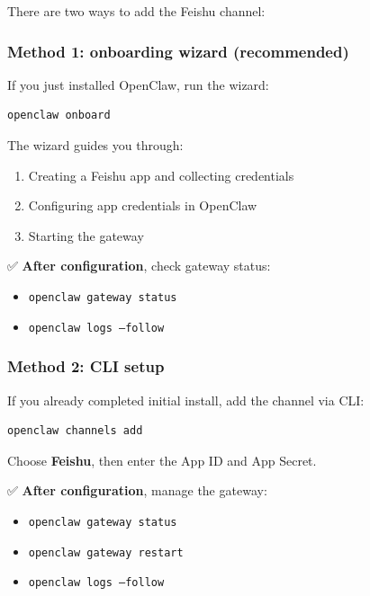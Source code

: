 There are two ways to add the Feishu channel:

\subsubsection{Method 1: onboarding wizard (recommended)}


If you just installed OpenClaw, run the wizard:

\begin{lstlisting}[language=bash]
openclaw onboard
\end{lstlisting}


The wizard guides you through:

\begin{enumerate}
  \item Creating a Feishu app and collecting credentials
  \item Configuring app credentials in OpenClaw
  \item Starting the gateway
\end{enumerate}


✅ \textbf{After configuration}, check gateway status:

\begin{itemize}
  \item \texttt{openclaw gateway status}
  \item \texttt{openclaw logs --follow}
\end{itemize}


\subsubsection{Method 2: CLI setup}


If you already completed initial install, add the channel via CLI:

\begin{lstlisting}[language=bash]
openclaw channels add
\end{lstlisting}


Choose \textbf{Feishu}, then enter the App ID and App Secret.

✅ \textbf{After configuration}, manage the gateway:

\begin{itemize}
  \item \texttt{openclaw gateway status}
  \item \texttt{openclaw gateway restart}
  \item \texttt{openclaw logs --follow}
\end{itemize}


